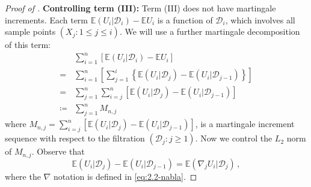 \documentclass[11pt]{article}
\theoremstyle{plain}
\newcommand{\D}{{\mathcal{D}}}
\begin{document}
\begin{proof}[Proof of ]
\textbf{Controlling term (III):} Term (III) does not have martingale increments.  Each term $\mathbb E(U_i|\D_{i})-\mathbb E U_i$ is a function of $\D_i$, which involves all sample points $(X_j:1\le j\le i)$.
We will use a further martingale decomposition of this term:
\begin{align*}
&  \sum_{i=1}^n  \left[\mathbb E(U_i|\D_i)-\mathbb E U_i\right]\\
=& \sum_{i=1}^n \left[\sum_{j=1}^i \left\{\mathbb E(U_i|\D_j)-\mathbb E(U_i|\D_{j-1})\right\}\right]\\
=&\sum_{j=1}^n \sum_{i=j}^n\left[\mathbb E(U_i|\D_j)-\mathbb E(U_i|\D_{j-1})\right]\\
\coloneqq& \sum_{j=1}^n M_{n,j}
\end{align*}
where $M_{n,j}=\sum_{i=j}^n\left[\mathbb E(U_i|\D_j)-\mathbb E(U_i|\D_{j-1})\right]$, is a martingale increment sequence with respect to the filtration $(\D_j:j\ge 1)$.  Now we control the $L_2$ norm of $M_{n,j}$. Observe that
$$
\mathbb E(U_i|\D_j)-\mathbb E(U_i|\D_{j-1}) =\mathbb E (\nabla_j U_i |\D_{j})\,,
$$
where the $\nabla$ notation is defined in \eqref{eq:2.2-nabla}.


\end{proof}
\end{document}
